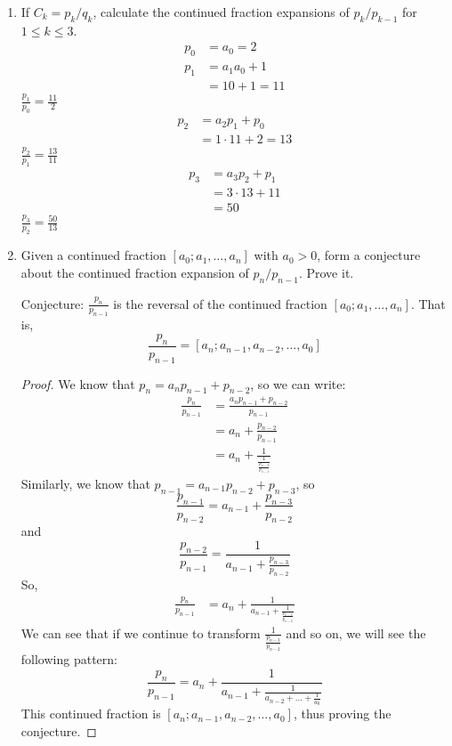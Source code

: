 \documentclass[11pt]{article}
\theoremstyle{definition}
\begin{document}
\begin{enumerate}
\begin{enumerate}
        \item If $C_k = p_k/q_k$, calculate the continued fraction expansions of $p_k/p_{k-1}$ for $1\leq k\leq 3$.
        \begin{align*}
            p_0 &= a_0 = 2 \\
            p_1 &= a_1a_0 + 1 \\
            &= 10 + 1 = 11
        \end{align*}
        $\frac{p_1}{p_0} = \frac{11}{2}$
        \begin{align*}
            p_2 &= a_2p_1 + p_0 \\
            &= 1\cdot 11 + 2 = 13
        \end{align*}
        $\frac{p_2}{p_1} = \frac{13}{11}$
        \begin{align*}
            p_3 &= a_3p_2 + p_1 \\
            &= 3\cdot 13 + 11 \\
            &= 50
        \end{align*}
        $\frac{p_3}{p_2} = \frac{50}{13}$ \\
        
        \item Given a continued fraction $[a_0;a_1,\dots,a_n]$ with $a_0>0$, form a conjecture about the continued fraction expansion of $p_n/p_{n-1}$. Prove it.
        
        Conjecture: $\frac{p_n}{p_{n-1}}$ is the reversal of the continued fraction $[a_0;a_1,\dots,a_n]$. That is,
        \[
            \frac{p_n}{p_{n-1}} = [a_n; a_{n-1}, a_{n-2}, \dots, a_0]
        \]

        \begin{proof}
            We know that $p_n = a_np_{n-1}+p_{n-2}$, so we can write:
            \begin{align*}
                \frac{p_n}{p_{n-1}} &= \frac{a_np_{n-1} + p_{n-2}}{p_{n-1}} \\
                &= a_n + \frac{p_{n-2}}{p_{n-1}} \\
                &= a_n + \frac{1}{\frac{1}{\frac{p_{n-2}}{p_{n-1}}}} 
            \end{align*}
            Similarly, we know that $p_{n-1} = a_{n-1}p_{n-2}  + p_{n-3}$, so 
            \[
                \frac{p_{n-1}}{p_{n-2}} = a_{n-1}  + \frac{p_{n-3}}{p_{n-2}}
            \] 
            and 
            \[
                \frac{p_{n-2}}{p_{n-1}} = \frac{1}{a_{n-1}  + \frac{p_{n-3}}{p_{n-2}}}
            \]
            So, 
            \begin{align*}
                \frac{p_n}{p_{n-1}} &= a_n + \frac{1}{a_{n-1} + \frac{1}{\frac{p_{n-3}}{p_{n-2}}}} 
            \end{align*}
            We can see that if we continue to transform 
            $\frac{1}{\frac{p_{n-3}}{p_{n-2}}}$ and so on, we will see 
            the following pattern:
            \[
                \frac{p_n}{p_{n-1}} = a_n + \frac{1}{a_{n-1} + \frac{1}{a_{n-2} + \dots + \frac{1}{a_0}}} 
            \]
            This continued fraction is $[a_n; a_{n-1}, a_{n-2}, \dots, a_0]$, 
            thus proving the conjecture.


\end{proof}
\end{enumerate}
\end{enumerate}
\end{document}
